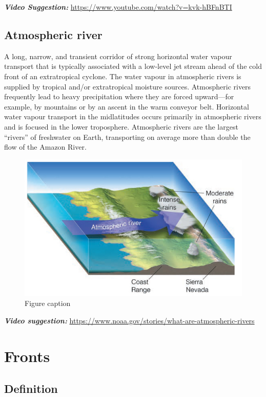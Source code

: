 \documentclass[12pt,oneside]{book}
\begin{document}
\textbf{\emph{Video Suggestion:}}
\url{https://www.youtube.com/watch?v=kvk-hBFnBTI}

\subsection{Atmospheric river}\label{atmospheric-river-1}

A long, narrow, and transient corridor of strong horizontal water vapour
transport that is typically associated with a low-level jet stream ahead
of the cold front of an extratropical cyclone. The water vapour in
atmospheric rivers is supplied by tropical and/or extratropical moisture
sources. Atmospheric rivers frequently lead to heavy precipitation where
they are forced upward---for example, by mountains or by an ascent in
the warm conveyor belt. Horizontal water vapour transport in the
midlatitudes occurs primarily in atmospheric rivers and is focused in
the lower troposphere. Atmospheric rivers are the largest ``rivers'' of
freshwater on Earth, transporting on average more than double the flow
of the Amazon River.

\begin{figure}

{\centering \includegraphics[width=0.8\linewidth]{figures/Figure613} 

}

\caption{Figure caption}\label{fig:Fig613}
\end{figure}

\textbf{\emph{Video suggestion:}}
\url{https://www.noaa.gov/stories/what-are-atmospheric-rivers}

\section{Fronts}\label{fronts}

\subsection{Definition}\label{definition-1}
\end{document}
